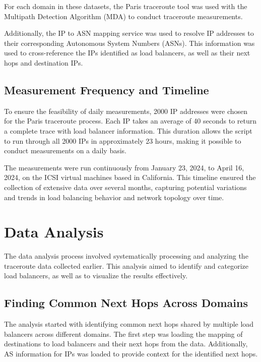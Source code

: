 \documentclass[12pt]{cwru_thesis}
\begin{document}
For each domain in these datasets, the Paris traceroute tool was used with the Multipath Detection Algorithm (MDA) to conduct traceroute measurements. 

Additionally, the IP to ASN mapping service was used to resolve IP addresses to their corresponding Autonomous System Numbers (ASNs). This information was used to cross-reference the IPs identified as load balancers, as well as their next hops and destination IPs.

\subsection{Measurement Frequency and Timeline}

To ensure the feasibility of daily measurements, 2000 IP addresses were chosen for the Paris traceroute process. Each IP takes an average of 40 seconds to return a complete trace with load balancer information. This duration allows the script to run through all 2000 IPs in approximately 23 hours, making it possible to conduct measurements on a daily basis.

The measurements were run continuously from January 23, 2024, to April 16, 2024, on the ICSI virtual machines based in California. This timeline ensured the collection of extensive data over several months, capturing potential variations and trends in load balancing behavior and network topology over time.

\section{Data Analysis}

The data analysis process involved systematically processing and analyzing the traceroute data collected earlier. This analysis aimed to identify and categorize load balancers, as well as to visualize the results effectively.


\subsection{Finding Common Next Hops Across Domains}

The analysis started with identifying common next hops shared by multiple load balancers across different domains. The first step was loading the mapping of destinations to load balancers and their next hops from the  data. Additionally, AS information for IPs was loaded to provide context for the identified next hops. 
\end{document}
